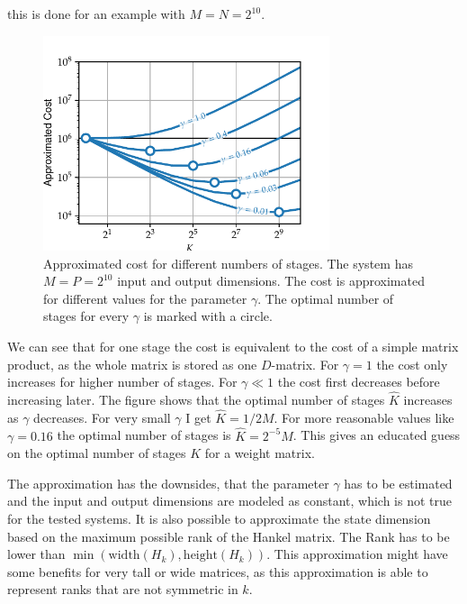 \documentclass[numbers=noenddot,doctype=mastersthesis,BCOR=15mm,biblatex]{ldvbook}%
\begin{document}
this is done for an example with $M=N = 2^{10}$.
\begin{figure}[htb]
	\centering
	\includegraphics[width=0.75\textwidth]{Plots/cost_parameters.pdf}
	\caption{Approximated cost for different numbers of stages. The system has $M=P=2^{10}$ input and output dimensions. 
	The cost is approximated for different values for the parameter $\gamma$.
	The optimal number of stages for every $\gamma$ is marked with a circle.}
	\label{fig:cost_parameters}
\end{figure}

We can see that for one stage the cost is equivalent to the cost of a simple matrix product, as the whole matrix is stored as one $D$-matrix.
For $\gamma = 1$ the cost only increases for higher number of stages. 
For $\gamma \ll 1$ the cost first decreases before increasing later.
The figure shows that the optimal number of stages $\hat{K}$ increases as $\gamma$ decreases.
For very small $\gamma$ I get $\hat{K} = 1/2 M$.
For more reasonable values like $\gamma=0.16$ the optimal number of stages is $\hat{K}=2^{-5}M$. 
This gives an educated guess on the optimal number of stages $K$ for a weight matrix.

The approximation has the downsides, that the parameter $\gamma$ has to be estimated
and the input and output dimensions are modeled as constant, which is not true for the tested systems.
It is also possible to approximate the state dimension based on the maximum possible rank of the Hankel matrix.
The Rank has to be lower than $\min(\text{width}(H_k),\text{height}(H_k))$.
This approximation might have some benefits for very tall or wide matrices, as this approximation is able to represent ranks that are not symmetric in $k$. 
\end{document}
